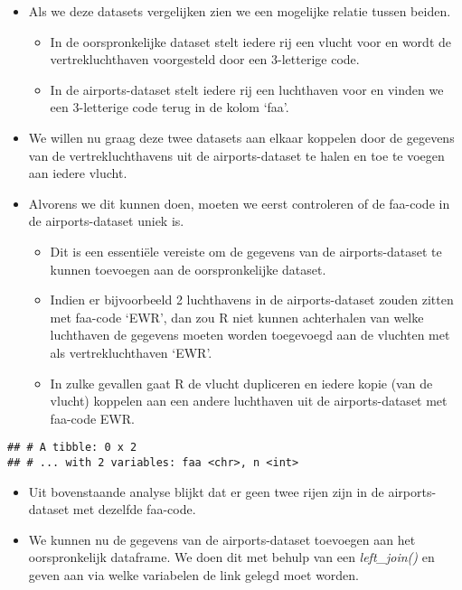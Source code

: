 \documentclass[]{memoir}
\providecommand{\tightlist}{%
  \setlength{\itemsep}{0pt}\setlength{\parskip}{0pt}}
\begin{document}
\begin{itemize}
\tightlist
\item
  Als we deze datasets vergelijken zien we een mogelijke relatie tussen
  beiden.

  \begin{itemize}
  \tightlist
  \item
    In de oorspronkelijke dataset stelt iedere rij een vlucht voor en
    wordt de vertrekluchthaven voorgesteld door een 3-letterige code.
  \item
    In de airports-dataset stelt iedere rij een luchthaven voor en
    vinden we een 3-letterige code terug in de kolom `faa'.
  \end{itemize}
\item
  We willen nu graag deze twee datasets aan elkaar koppelen door de
  gegevens van de vertrekluchthavens uit de airports-dataset te halen en
  toe te voegen aan iedere vlucht.
\item
  Alvorens we dit kunnen doen, moeten we eerst controleren of de
  faa-code in de airports-dataset uniek is.

  \begin{itemize}
  \tightlist
  \item
    Dit is een essentiële vereiste om de gegevens van de
    airports-dataset te kunnen toevoegen aan de oorspronkelijke dataset.
  \item
    Indien er bijvoorbeeld 2 luchthavens in de airports-dataset zouden
    zitten met faa-code `EWR', dan zou R niet kunnen achterhalen van
    welke luchthaven de gegevens moeten worden toegevoegd aan de
    vluchten met als vertrekluchthaven `EWR'.
  \item
    In zulke gevallen gaat R de vlucht dupliceren en iedere kopie (van
    de vlucht) koppelen aan een andere luchthaven uit de
    airports-dataset met faa-code EWR.
  \end{itemize}
\end{itemize}

\begin{verbatim}
## # A tibble: 0 x 2
## # ... with 2 variables: faa <chr>, n <int>
\end{verbatim}

\begin{itemize}
\tightlist
\item
  Uit bovenstaande analyse blijkt dat er geen twee rijen zijn in de
  airports-dataset met dezelfde faa-code.
\item
  We kunnen nu de gegevens van de airports-dataset toevoegen aan het
  oorspronkelijk dataframe. We doen dit met behulp van een
  \emph{left\_join()} en geven aan via welke variabelen de link gelegd
  moet worden.
\end{itemize}
\end{document}

